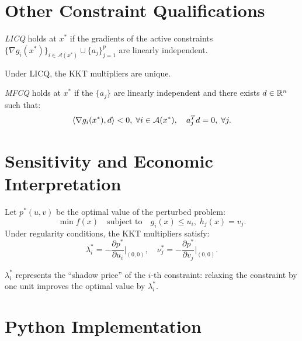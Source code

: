 \section{Other Constraint Qualifications}

\begin{definition}
\emph{LICQ} holds at $x^*$ if the gradients of the active constraints
$\{\nabla g_i(x^*)\}_{i \in \mathcal{A}(x^*)} \cup \{a_j\}_{j=1}^p$ are linearly
independent.
\end{definition}

\begin{proposition}
Under LICQ, the KKT multipliers are unique.
\end{proposition}

\begin{definition}
\emph{MFCQ} holds at $x^*$ if the $\{a_j\}$ are linearly independent and there
exists $d \in \mathbb{R}^n$ such that:
\[
    \langle \nabla g_i(x^*), d \rangle < 0, \; \forall i \in \mathcal{A}(x^*), \quad
    a_j^T d = 0, \; \forall j.
\]
\end{definition}

\section{Sensitivity and Economic Interpretation}

\begin{theorem}[Sensitivity]
\label{thm:sensitivity}
Let $p^*(u, v)$ be the optimal value of the perturbed problem:
\[
    \min f(x) \quad \text{subject to} \quad g_i(x) \leq u_i, \; h_j(x) = v_j.
\]
Under regularity conditions, the KKT multipliers satisfy:
\[
    \lambda_i^* = -\frac{\partial p^*}{\partial u_i}\bigg|_{(0,0)}, \quad
    \nu_j^* = -\frac{\partial p^*}{\partial v_j}\bigg|_{(0,0)}.
\]
\end{theorem}

\begin{remark}
$\lambda_i^*$ represents the ``shadow price'' of the $i$-th constraint: relaxing the
constraint by one unit improves the optimal value by $\lambda_i^*$.
\end{remark}

\section{Python Implementation}

